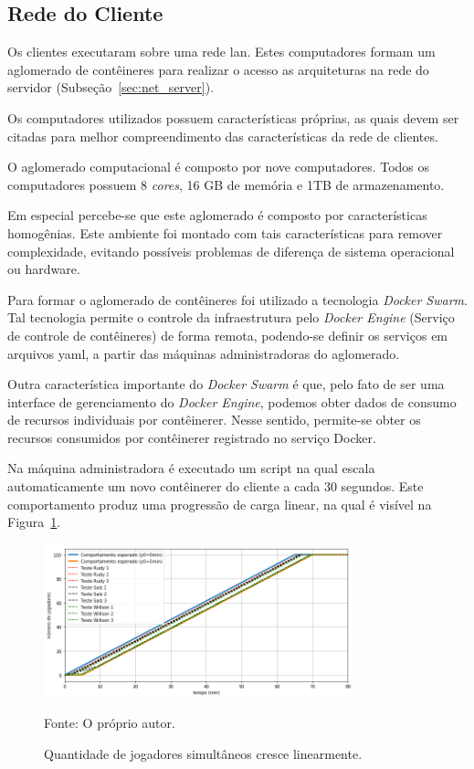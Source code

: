 \subsection{Rede do Cliente}
\label{sec:net_cliente}


Os clientes executaram sobre uma rede \ac{lan}.
%
Estes computadores formam um aglomerado de contêineres para realizar o acesso as arquiteturas na rede do servidor (Subseção~\ref{sec:net_server}).

Os computadores utilizados possuem características próprias, as quais devem ser citadas para melhor compreendimento das características da rede de clientes.

O aglomerado computacional é composto por nove computadores.
%
Todos os computadores possuem 8 \textit{cores}, 16 GB de memória e 1TB de armazenamento.

Em especial percebe-se que este aglomerado é composto por características homogênias.
%
Este ambiente foi montado com tais características para remover complexidade, evitando possíveis problemas de diferença de sistema operacional ou hardware.

Para formar o aglomerado de contêineres foi utilizado a tecnologia \textit{Docker Swarm}.
%
Tal tecnologia permite o controle da infraestrutura pelo \textit{Docker Engine} (Serviço de controle de contêineres) de forma remota, podendo-se definir os serviços em arquivos \ac{yaml}, a partir das máquinas administradoras do aglomerado.

Outra característica importante do \textit{Docker Swarm} é que, pelo fato de ser uma interface de gerenciamento do \textit{Docker Engine}, podemos obter dados de consumo de recursos individuais por contêinerer.
%
Nesse sentido, permite-se obter os recursos consumidos por contêinerer registrado no serviço Docker.

Na máquina administradora é executado um script na qual escala automaticamente um novo contêinerer do cliente a cada 30 segundos.
%
Este comportamento produz uma progressão de carga linear, na qual é visível na Figura~\ref{fig:cliente_linear}.

\begin{figure}[htb!]
  \caption{Quantidade de jogadores simultâneos cresce linearmente.}
  \label{fig:cliente_linear}
  \includegraphics[width=0.8\textwidth]{figuras/network/clientes_script.png}
  \centering

  Fonte: O próprio autor.
\end{figure}

